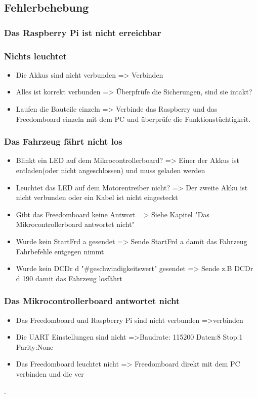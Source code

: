 \subsection{Fehlerbehebung}
\subsubsection{Das Raspberry Pi ist nicht erreichbar}
\subsubsection{Nichts leuchtet}
\begin{itemize}
\item Die Akkus sind nicht verbunden => Verbinden
\item Alles ist korrekt verbunden => Überpfrüfe die Sicherungen, sind sie intakt?
\item Laufen die Bauteile einzeln => Verbinde das Raspberry und das Freedomboard einzeln mit dem PC und überprüfe die Funktionstüchtigkeit.
\end{itemize}

\subsubsection{Das Fahrzeug fährt nicht los}
\begin{itemize}
\item Blinkt ein LED auf dem Mikrocontrollerboard? => Einer der Akkus ist entladen(oder nicht angeschlossen) und muss geladen werden
\item Leuchtet das LED auf dem Motorentreiber nicht? => Der zweite Akku ist nicht verbunden oder ein Kabel ist nicht eingesteckt
\item Gibt das Freedomboard keine Antwort => Siehe Kapitel "Das Mikrocontrollerboard antwortet nicht"
\item Wurde kein StartFrd a gesendet => Sende StartFrd a damit das Fahrzeug Fahrbefehle entgegen nimmt
\item Wurde kein DCDr d "#geschwindigkeitswert" gesendet => Sende z.B DCDr d 190 damit das Fahrzeug losfährt
\end{itemize}

\subsubsection{Das Mikrocontrollerboard antwortet nicht}
\begin{itemize}
\item Das Freedomboard und Raspberry Pi sind nicht verbunden =>verbinden
\item Die UART Einstellungen sind nicht =>Baudrate: 115200 Daten:8 Stop:1 Parity:None
\item Das Freedomboard leuchtet nicht => Freedomboard direkt mit dem PC verbinden und die ver

\end{itemize}
. 
